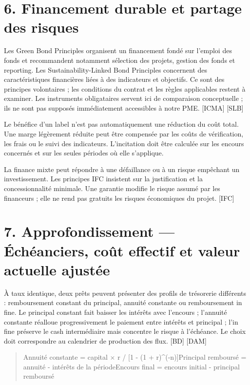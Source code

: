 \documentclass[12pt,a4paper]{article}
\begin{document}
\section*{6. Financement durable et partage des risques}
Les Green Bond Principles organisent un financement fondé sur l’emploi des fonds et recommandent notamment sélection des projets, gestion des fonds et reporting. Les Sustainability-Linked Bond Principles concernent des caractéristiques financières liées à des indicateurs et objectifs. Ce sont des principes volontaires ; les conditions du contrat et les règles applicables restent à examiner. Les instruments obligataires servent ici de comparaison conceptuelle ; ils ne sont pas supposés immédiatement accessibles à notre PME. [ICMA] [SLB]


Le bénéfice d’un label n’est pas automatiquement une réduction du coût total. Une marge légèrement réduite peut être compensée par les coûts de vérification, les frais ou le suivi des indicateurs. L’incitation doit être calculée sur les encours concernés et sur les seules périodes où elle s’applique.


La finance mixte peut répondre à une défaillance ou à un risque empêchant un investissement. Les principes IFC insistent sur la justification et la concessionnalité minimale. Une garantie modifie le risque assumé par les financeurs ; elle ne rend pas gratuits les risques économiques du projet. [IFC]

\section*{7. Approfondissement --- Échéanciers, coût effectif et valeur actuelle ajustée}
À taux identique, deux prêts peuvent présenter des profils de trésorerie différents : remboursement constant du principal, annuité constante ou remboursement in fine. Le principal constant fait baisser les intérêts avec l’encours ; l’annuité constante réalloue progressivement le paiement entre intérêts et principal ; l’in fine préserve le cash intermédiaire mais concentre le risque à l’échéance. Le choix doit correspondre au calendrier de production des flux. [BD] [DAM]



\begin{quote}\small Annuité constante = capital $\times$ r / [1 - (1 + r)\textasciicircum{}(-n)]\newline Principal remboursé = annuité - intérêts de la période\newline Encours final = encours initial - principal remboursé\end{quote}
\end{document}
